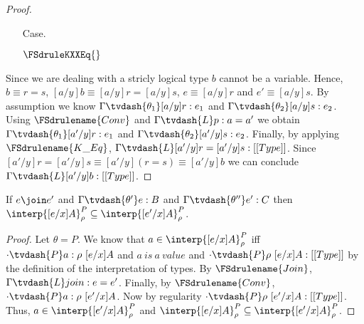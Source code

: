 \begin{proof}
\begin{itemize}
  \item[Case.] \ \\
    \begin{center}
      $\FSdruleKXXEq{}$
    \end{center}
  \end{itemize}
  Since we are dealing with a stricly logical type $b$ cannot be a variable.  Hence, 
  $b \equiv r = s$, $[a/y]b \equiv [a/y]r = [a/y]s$, $e \equiv [a/y]r$ and $e' \equiv [a/y]s$.
  By assumption we know $\Gamma \tvdash{\theta_1} [a/y]r:e_1$ and 
  $\Gamma \tvdash{\theta_2} [a/y]s:e_2$.  Using $\FSdrulename{Conv}$ and 
  $\Gamma \tvdash{L} p:a = a'$ we obtain $\Gamma \tvdash{\theta_1} [a'/y]r:e_1$ and 
  $\Gamma \tvdash{\theta_2} [a'/y]s:e_2$.  Finally, by applying $\FSdrulename{K\_Eq}$,
  $\Gamma \tvdash{L} [a'/y]r = [a'/y]s:[[Type]]$.  Since $[a'/y]r = [a'/y]s \equiv 
  [a'/y](r = s) \equiv [a'/y]b$ we can conclude $\Gamma \tvdash{L} [a'/y]b:[[Type]]$.
\end{proof}

\begin{lemma}
  \label{lemma:pconv_in_interp_are_equiv}
  If $e \join e'$ and $\Gamma \tvdash{\theta'} e:B$ and 
  $\Gamma \tvdash{\theta''} e':C$ then 
  $\interp{[e/x]A}^P_\rho \subseteq \interp{[e'/x]A}^P_\rho$.
\end{lemma}
\begin{proof}
  Let $\theta = P$.  We know that $a \in \interp{[e/x]A}^P_\rho$
  iff $\cdot \tvdash{P} a:\rho\ [e/x]A$ and $a\ is\ a\ value$ and $
  \cdot \tvdash{P} \rho\ [e/x]A:[[Type]]$ 
  by the definition of the interpretation of types.
  By $\FSdrulename{Join}$, $\Gamma \tvdash{L} join:e = e'$. Finally, by 
  $\FSdrulename{Conv}$, 
  $\cdot \tvdash{P} a:\rho\ [e'/x]A$.  Now by regularity $\cdot \tvdash{P} \rho\ [e'/x]A:[[Type]]$.
  Thus, $a \in \interp{[e'/x]A}^P_\rho$ and
  $\interp{[e/x]A}^P_\rho \subseteq \interp{[e'/x]A}^P_\rho$.
\end{proof}

